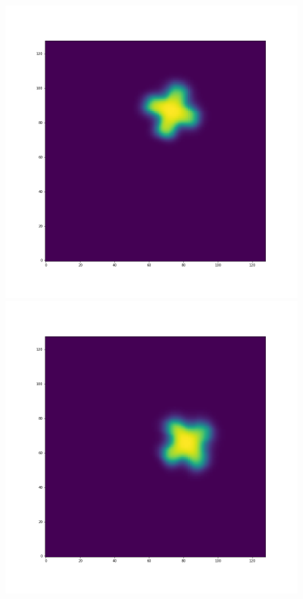 \documentclass[12pt,a4paper]{article}
\begin{document}
\begin{figure}[H]
\centering
\begin{minipage}{.3\textwidth}
  \centering
  \includegraphics[width=\linewidth]{Pictures/PlusRotateTestMUSCL/PlusRotateTest_t30.png}
\end{minipage}%
\begin{minipage}{.3\textwidth}
  \centering
  \includegraphics[width=\linewidth]{Pictures/PlusRotateTestMUSCL/PlusRotateTest_t40.png}

\end{minipage}
\end{figure}
\end{document}
